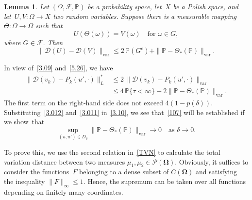 \documentclass[11pt]{article}
\theoremstyle{plain}
\newtheorem{lemma}[theorem]{Lemma}
\theoremstyle{definition}
\let\mathcal\mathscr
\theoremstyle{plain}
\numberwithin{equation}{section}
\newcommand{\IP}{{\mathbb P}}
\newcommand{\OOmega}{{\boldsymbol\Omega}}
\newcommand{\DD}{{\mathcal D}}
\newcommand{\FF}{{\mathcal F}}
\newcommand{\PP}{{\mathcal P}}
\begin{document}
\begin{lemma} \label{l5.4}
Let $(\Omega,\FF,\IP)$ be a probability space, let~$X$ be a Polish space, and let~$U,V:\Omega\to X$ two random variables. Suppose there is a measurable mapping $\Theta:\Omega\to\Omega$ such that\vspace*{-3pt}
\begin{equation} \label{5.25}
U(\Theta(\omega))=V(\omega)\quad\text{for $\omega\in G$},
\end{equation}
where $G\in\FF$. Then\vspace*{-3pt}
\begin{equation} \label{5.26}
\|\DD(U)-\DD(V)\|_{\mathrm{var}}
\le 2\,\IP(G^c)+\|\IP-\Theta_*(\IP)\|_{\mathrm{var}}.
\end{equation}
\end{lemma}

In view of~\eqref{3.09} and~\eqref{5.26}, we have
\begin{equation}
\begin{aligned}
\|\DD(v_k)-P_k(u',\cdot)\|_L^*
&\le 2\,\|\DD(v_k)-P_k(u',\cdot)\|_{\mathrm{var}}\\
&\le 4\,\IP\{\tau<\infty\}+2\|\IP-\Theta_*(\IP)\|_{\mathrm{var}}.
\label{3.012}
\end{aligned}
\end{equation}
The first term on the right-hand side does not exceed $4(1-p(\delta))$. Substituting~\eqref{3.012} and~\eqref{3.011} in~\eqref{3.10}, we see that~\eqref{107} will be established if we show~that
\begin{equation} \label{1.15}
\sup_{(u,u')\in D_\delta}
\|\IP-\Theta_*(\IP)\|_{\mathrm{var}}\to0\quad\text{as $\delta\to0$}.
\end{equation}

To prove this, we use the second relation in~\eqref{TVN} to calculate the total variation distance between two measures $\mu_1,\mu_2\in\PP(\OOmega)$. Obviously, it suffices to consider the functions~$F$ belonging to a dense subset of $C(\OOmega)$ and satisfying the inequality $\|F\|_\infty\le 1$. Hence, the supremum can be taken over all functions depending on finitely many coordinates.
\end{document}
